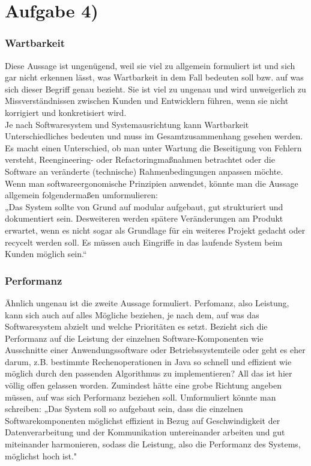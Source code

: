 \documentclass{swp1}
\begin{document}
\section*{Aufgabe 4)}

\subsubsection*{Wartbarkeit}
Diese Aussage ist ungenügend, weil sie viel zu allgemein formuliert ist und sich gar nicht erkennen lässt, was Wartbarkeit in dem Fall bedeuten soll bzw. auf was sich dieser Begriff genau bezieht. Sie ist viel zu ungenau und wird unweigerlich zu Missverständnissen zwischen Kunden und Entwicklern führen, wenn sie nicht korrigiert und konkretisiert wird. \\
Je nach Softwaresystem und Systemausrichtung kann Wartbarkeit Unterschiedliches bedeuten und muss im Gesamtzusammenhang gesehen werden. Es macht einen Unterschied, ob man unter Wartung die Beseitigung von Fehlern versteht, Reengineering- oder Refactoringmaßnahmen betrachtet oder die Software an veränderte (technische) Rahmenbedingungen anpassen möchte. \\
Wenn man softwareergonomische Prinzipien anwendet, könnte man die Aussage allgemein folgendermaßen umformulieren:\\
„Das System sollte von Grund auf modular aufgebaut, gut strukturiert und dokumentiert sein.
Desweiteren werden spätere Veränderungen am Produkt erwartet, wenn es nicht sogar als
Grundlage für ein weiteres Projekt gedacht oder recycelt werden soll. Es müssen auch Eingriffe in
das laufende System beim Kunden möglich sein.“

\subsubsection*{Performanz}
Ähnlich ungenau ist die zweite Aussage formuliert. Perfomanz, also Leistung, kann sich auch auf alles Mögliche beziehen, je nach dem, auf was das Softwaresystem abzielt und welche Prioritäten es setzt. Bezieht sich die Performanz auf die Leistung der einzelnen Software-Komponenten wie Ausschnitte einer Anwendungssoftware oder Betriebssystemteile oder geht es eher darum, z.B. bestimmte Rechenoperationen in Java so schnell und effizient wie möglich durch den passenden Algorithmus zu implementieren? All das ist hier völlig offen gelassen worden. Zumindest hätte eine grobe Richtung angeben müssen, auf was sich Performanz beziehen soll.
Umformuliert könnte man schreiben: „Das System soll so aufgebaut sein, dass die einzelnen Softwarekomponenten möglichst effizient in Bezug auf Geschwindigkeit der Datenverarbeitung und der Kommunikation untereinander arbeiten und gut miteinander harmonieren, sodass die Leistung, also die Performanz des Systems, möglichst hoch ist."
\end{document}
